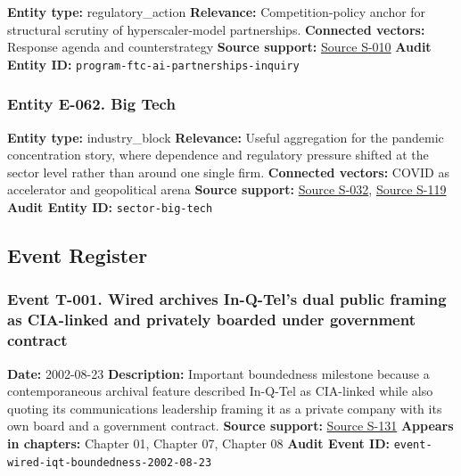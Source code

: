 \documentclass[
  american,
  11pt,
  letterpaper,
]{article}
\begin{document}
\textbf{Entity type:} regulatory\_action \textbf{Relevance:}
Competition-policy anchor for structural scrutiny of hyperscaler-model
partnerships. \textbf{Connected vectors:} Response agenda and
counterstrategy \textbf{Source support:}
\hyperref[source-s-010-ftc-opens-inquiry-into-big-tech-s-partnerships-with-leading-ai-startups]{Source
S-010} \textbf{Audit Entity ID:}
\texttt{program-ftc-ai-partnerships-inquiry}

\subsubsection{Entity E-062. Big Tech}\label{entity-e-062-big-tech}

\textbf{Entity type:} industry\_block \textbf{Relevance:} Useful
aggregation for the pandemic concentration story, where dependence and
regulatory pressure shifted at the sector level rather than around one
single firm. \textbf{Connected vectors:} COVID as accelerator and
geopolitical arena \textbf{Source support:}
\hyperref[source-s-032-pandemic-provides-a-techlash-reprieve]{Source
S-032},
\hyperref[source-s-119-big-tech-announces-striking-pandemic-gains-as-small-businesses-strain-to-find-their-footing]{Source
S-119} \textbf{Audit Entity ID:} \texttt{sector-big-tech}

\subsection{Event Register}\label{event-register}

\subsubsection{Event T-001. Wired archives In-Q-Tel's dual public
framing as CIA-linked and privately boarded under government
contract}\label{event-t-001-wired-archives-in-q-tel-s-dual-public-framing-as-cia-linked-and-privately-boarded-under-government-contract}

\textbf{Date:} 2002-08-23 \textbf{Description:} Important boundedness
milestone because a contemporaneous archival feature described In-Q-Tel
as CIA-linked while also quoting its communications leadership framing
it as a private company with its own board and a government contract.
\textbf{Source support:}
\hyperref[source-s-131-it-pays-to-play-with-the-cia]{Source S-131}
\textbf{Appears in chapters:} Chapter 01, Chapter 07, Chapter 08
\textbf{Audit Event ID:} \texttt{event-wired-iqt-boundedness-2002-08-23}
\end{document}

